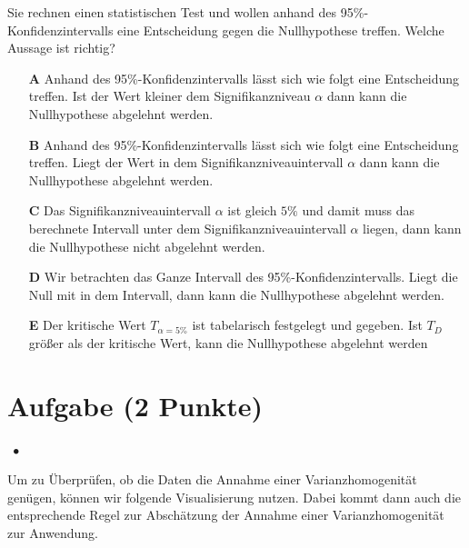 \documentclass[a4paper, 9pt]{scrartcl}\usepackage[]{graphicx}\usepackage[]{xcolor}
\begin{document}
Sie rechnen einen statistischen Test und wollen anhand des 95\%-Konfidenzintervalls eine Entscheidung gegen die Nullhypothese treffen. Welche Aussage ist richtig?





\begin{enumerate}
\item [\textbf{A} \msquare] Anhand des 95\%-Konfidenzintervalls lässt sich wie folgt eine Entscheidung treffen. Ist der Wert kleiner dem Signifikanzniveau $\alpha$ dann kann die Nullhypothese abgelehnt werden.
\item [\textbf{B} \msquare] Anhand des 95\%-Konfidenzintervalls lässt sich wie folgt eine Entscheidung treffen. Liegt der Wert in dem Signifikanzniveauintervall $\alpha$ dann kann die Nullhypothese abgelehnt werden.
\item [\textbf{C} \msquare] Das Signifikanzniveauintervall $\alpha$ ist gleich $5\%$ und damit muss das berechnete Intervall unter dem Signifikanzniveauintervall $\alpha$ liegen, dann kann die Nullhypothese nicht abgelehnt werden.
\item [\textbf{D} \msquare] Wir betrachten das Ganze Intervall des 95\%-Konfidenzintervalls. Liegt die Null mit in dem Intervall, dann kann die Nullhypothese abgelehnt werden.
\item [\textbf{E} \msquare] Der kritische Wert $T_{\alpha = 5\%}$ ist tabelarisch festgelegt und gegeben. Ist $T_{D}$ größer als der kritische Wert, kann die Nullhypothese abgelehnt werden
\end{enumerate} 

\section{Aufgabe \hfill (2 Punkte)}


\ifcollection
\begin{flushright}
\tiny\vspace{-2Ex}
\textbf{\examinhaltstart}
\exammodulestatversuch $\;\bullet$
\exammodulebiostat
\vspace{-1Ex}
\end{flushright}
\fi




Um zu Überprüfen, ob die Daten die Annahme einer Varianzhomogenität genügen, können wir folgende Visualisierung nutzen. Dabei kommt dann auch die entsprechende Regel zur Abschätzung der Annahme einer Varianzhomogenität zur Anwendung.
\end{document}
